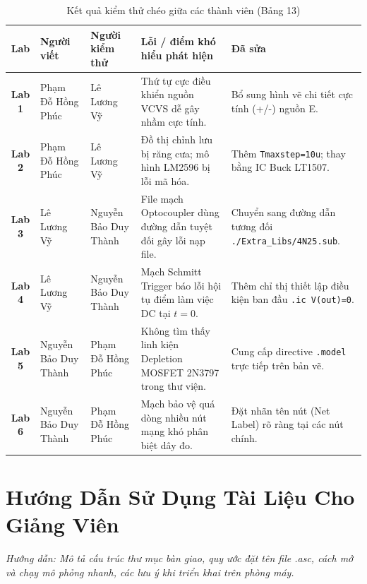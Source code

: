 \documentclass[12pt,a4paper]{report}
\begin{document}
\begin{table}[H]
\centering
\caption{Kết quả kiểm thử chéo giữa các thành viên (Bảng 13)}
\label{tab:bang13_kiemthu}
\renewcommand{\arraystretch}{1.3}
\small
\begin{tabularx}{\textwidth}{|c|p{2.5cm}|p{2.5cm}|X|p{4.0cm}|}
\hline
\rowcolor{codebg}
\textbf{Lab} & \textbf{Người viết} & \textbf{Người kiểm thử} & \textbf{Lỗi / điểm khó hiểu phát hiện} & \textbf{Đã sửa} \\ \hline
\textbf{Lab 1} & Phạm Đỗ Hồng Phúc & Lê Lương Vỹ & Thứ tự cực điều khiển nguồn VCVS dễ gây nhầm cực tính. & Bổ sung hình vẽ chi tiết cực tính (+/-) nguồn E. \\ \hline
\textbf{Lab 2} & Phạm Đỗ Hồng Phúc & Lê Lương Vỹ & Đồ thị chỉnh lưu bị răng cưa; mô hình LM2596 bị lỗi mã hóa. & Thêm \lstinline|Tmaxstep=10u|; thay bằng IC Buck LT1507. \\ \hline
\textbf{Lab 3} & Lê Lương Vỹ & Nguyễn Bảo Duy Thành & File mạch Optocoupler dùng đường dẫn tuyệt đối gây lỗi nạp file. & Chuyển sang đường dẫn tương đối \texttt{./Extra\_Libs/4N25.sub}. \\ \hline
\textbf{Lab 4} & Lê Lương Vỹ & Nguyễn Bảo Duy Thành & Mạch Schmitt Trigger báo lỗi hội tụ điểm làm việc DC tại $t=0$. & Thêm chỉ thị thiết lập điều kiện ban đầu \lstinline|.ic V(out)=0|. \\ \hline
\textbf{Lab 5} & Nguyễn Bảo Duy Thành & Phạm Đỗ Hồng Phúc & Không tìm thấy linh kiện Depletion MOSFET 2N3797 trong thư viện. & Cung cấp directive \lstinline|.model| trực tiếp trên bản vẽ. \\ \hline
\textbf{Lab 6} & Nguyễn Bảo Duy Thành & Phạm Đỗ Hồng Phúc & Mạch bảo vệ quá dòng nhiều nút mạng khó phân biệt dây đo. & Đặt nhãn tên nút (Net Label) rõ ràng tại các nút chính. \\ \hline
\end{tabularx}
\end{table}

\chapter{Hướng Dẫn Sử Dụng Tài Liệu Cho Giảng Viên}

\textit{\color{guidegray}
Hướng dẫn: Mô tả cấu trúc thư mục bàn giao, quy ước đặt tên file .asc, cách mở và chạy mô phỏng nhanh, các lưu ý khi triển khai trên phòng máy.
}
\end{document}
